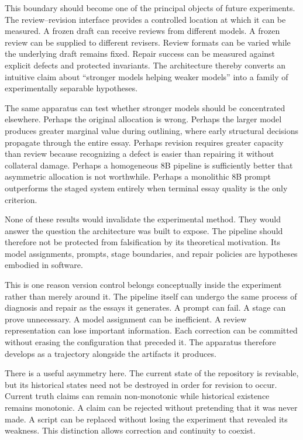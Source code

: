 \documentclass[11pt]{article}
\begin{document}
This boundary should become one of the principal objects of future experiments. The review--revision interface provides a controlled location at which it can be measured. A frozen draft can receive reviews from different models. A frozen review can be supplied to different revisers. Review formats can be varied while the underlying draft remains fixed. Repair success can be measured against explicit defects and protected invariants. The architecture thereby converts an intuitive claim about ``stronger models helping weaker models'' into a family of experimentally separable hypotheses.

The same apparatus can test whether stronger models should be concentrated elsewhere. Perhaps the original allocation is wrong. Perhaps the larger model produces greater marginal value during outlining, where early structural decisions propagate through the entire essay. Perhaps revision requires greater capacity than review because recognizing a defect is easier than repairing it without collateral damage. Perhaps a homogeneous 8B pipeline is sufficiently better that asymmetric allocation is not worthwhile. Perhaps a monolithic 8B prompt outperforms the staged system entirely when terminal essay quality is the only criterion.

None of these results would invalidate the experimental method. They would answer the question the architecture was built to expose. The pipeline should therefore not be protected from falsification by its theoretical motivation. Its model assignments, prompts, stage boundaries, and repair policies are hypotheses embodied in software.

This is one reason version control belongs conceptually inside the experiment rather than merely around it. The pipeline itself can undergo the same process of diagnosis and repair as the essays it generates. A prompt can fail. A stage can prove unnecessary. A model assignment can be inefficient. A review representation can lose important information. Each correction can be committed without erasing the configuration that preceded it. The apparatus therefore develops as a trajectory alongside the artifacts it produces.

There is a useful asymmetry here. The current state of the repository is revisable, but its historical states need not be destroyed in order for revision to occur. Current truth claims can remain non-monotonic while historical existence remains monotonic. A claim can be rejected without pretending that it was never made. A script can be replaced without losing the experiment that revealed its weakness. This distinction allows correction and continuity to coexist.
\end{document}
